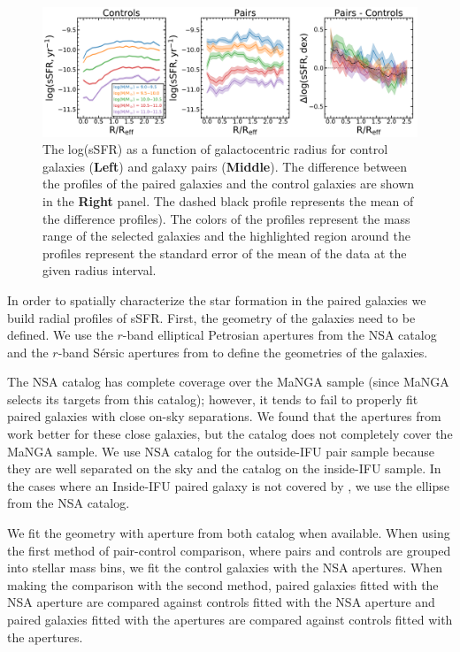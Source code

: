 \documentclass[iop,revtex4,twocolumn,apj,numberedappendix,appendixfloats]{emulateapj}
\begin{document}
\begin{figure}
\centering
\includegraphics[width=\linewidth]{fig/ssfr_comb.pdf}
\caption[]{The log(sSFR) as a function of galactocentric radius for control galaxies (\textbf{Left}) and galaxy pairs (\textbf{Middle}). The difference between the profiles of the paired galaxies and the control galaxies are shown in the \textbf{Right} panel. The dashed black profile represents the mean of the difference profiles). The colors of the profiles represent the mass range of the selected galaxies and the highlighted region around the profiles represent the standard error of the mean of the data at the given radius interval.}
\label{fig:ssfr_prof}
\end{figure}

In order to spatially characterize the star formation in the paired galaxies we build radial profiles of sSFR. First, the geometry of the galaxies need to be defined.  We use the $r$-band elliptical Petrosian apertures from the NSA catalog and the $r$-band S\'ersic apertures from \citet{Simard:2011} to define the geometries of the galaxies. 

The NSA catalog has complete coverage over the MaNGA sample (since MaNGA selects its targets from this catalog); however, it tends to fail to properly fit paired galaxies with close on-sky separations. We found that the apertures from \citet{Simard:2011} work better for these close galaxies, but the catalog does not completely cover the MaNGA sample. We use NSA catalog for the outside-IFU pair sample because they are well separated on the sky and the \citet{Simard:2011} catalog on the inside-IFU sample. In the cases where an Inside-IFU paired galaxy is not covered by \citet{Simard:2011}, we use the ellipse from the NSA catalog. 

We fit the geometry with aperture from both catalog when available. When using the first method of pair-control comparison, where pairs and controls are grouped into stellar mass bins, we fit the control galaxies with the NSA apertures. When making the comparison with the second method, paired galaxies fitted with the NSA aperture are compared against controls fitted with the NSA aperture and paired galaxies fitted with the \citet{Simard:2011} apertures are compared against controls fitted with the \citet{Simard:2011} apertures. 
\end{document}
